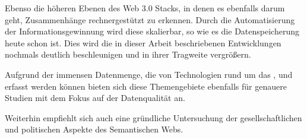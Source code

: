 Ebenso die höheren Ebenen des Web 3.0 Stacks, in denen es ebenfalls darum geht, Zusammenhänge rechnergestützt zu erkennen. Durch die Automatisierung der Informationsgewinnung wird diese skalierbar, so wie es die Datenspeicherung heute schon ist. Dies wird die in dieser Arbeit beschriebenen Entwicklungen nochmals deutlich beschleunigen und in ihrer Tragweite vergrößern. 

Aufgrund der immensen Datenmenge, die von Technologien rund um das ,  und  erfasst werden können bieten sich diese Themengebiete ebenfalls für genauere Studien mit dem Fokus auf der Datenqualität an.

Weiterhin empfiehlt sich auch eine gründliche Untersuchung der gesellschaftlichen und politischen Aspekte des Semantischen Webs.
